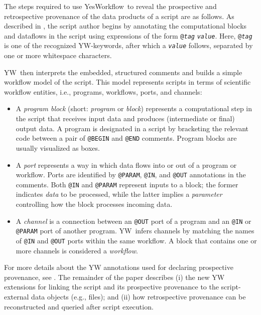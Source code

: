 \documentclass[letterpaper,twocolumn,10pt]{article}
\newcommand{\YW}{\textsf{YesWorkflow}}
\newcommand{\yw}{\textsf{YW}}
\newcommand{\ywa}[1]{\texttt{#1}}
\begin{document}

The steps required to use \YW\ to reveal the prospective and
retrospective provenance of the data products of a script are as
follows.  As described in \cite{mcphillips2015ywIJDC}, the script
author begins by annotating the computational blocks and dataflows in
the script using expressions of the form
\ywa{@\emph{tag}}\,\textvisiblespace\,\ywa{\emph{value}}. Here,
\ywa{@\emph{tag}} is one of the recognized \yw-keywords, after which a
\ywa{\emph{value}} follows, separated by one or more whitespace
characters.

\yw\ then interprets the embedded, structured comments and builds a
simple workflow model of the script. This model represents scripts in
terms of scientific workflow entities, i.e., programs, workflows,
ports, and channels:

\begin{itemize}
\item A \emph{program block} (short: \emph{program} or \emph{block})
  represents a computational step in the script that receives input
  data and produces (intermediate or final) output data. A program is
  designated in a script by bracketing the relevant code between a
  pair of \ywa{@BEGIN} and \ywa{@END} comments. Program blocks are
  usually visualized as boxes. 
\item A \emph{port} represents a way in which data flows into or out
  of a program or workflow. Ports are identified by \ywa{@PARAM},
  \ywa{@IN}, and \ywa{@OUT} annotations in the comments.  Both
  \ywa{@IN} and \ywa{@PARAM} represent inputs to a block; the former
  indicates \emph{data} to be processed, while the latter implies a
  \emph{parameter} controlling how the block processes incoming data.
\item A \emph{channel} is a connection between an \ywa{@OUT} port of a
  program and an \ywa{@IN} or \ywa{@PARAM} port of another 
  program. \yw\ infers channels by matching the names of \ywa{@IN} and
  \ywa{@OUT} ports within the same workflow.  A block that contains
  one or more channels is considered a \emph{workflow}.
\end{itemize}

For more details about the YW annotations used for declaring
prospective provenance, see \cite{mcphillips2015ywIJDC}.  The
remainder of the paper describes (i) the new YW extensions for linking
the script and its prospective provenance to the script-external data
objects (e.g., files); and (ii) how retrospective provenance can be
reconstructed and queried after script execution.
\end{document}
